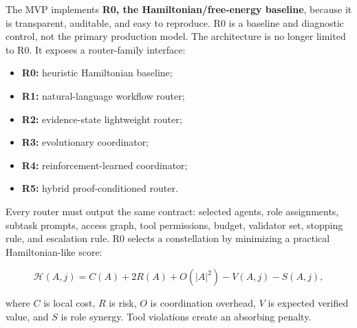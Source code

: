 \documentclass[11pt]{article}
\providecommand{\tightlist}{\setlength{\itemsep}{0pt}\setlength{\parskip}{0pt}}
\begin{document}
The MVP implements \textbf{R0, the Hamiltonian/free-energy baseline}, because it is transparent, auditable, and easy to reproduce. R0 is a baseline and diagnostic control, not the primary production model. The architecture is no longer limited to R0. It exposes a router-family interface:

\begin{itemize}
\tightlist
\item
  \textbf{R0:} heuristic Hamiltonian baseline;
\item
  \textbf{R1:} natural-language workflow router;
\item
  \textbf{R2:} evidence-state lightweight router;
\item
  \textbf{R3:} evolutionary coordinator;
\item
  \textbf{R4:} reinforcement-learned coordinator;
\item
  \textbf{R5:} hybrid proof-conditioned router.
\end{itemize}

Every router must output the same contract: selected agents, role assignments, subtask prompts, access graph, tool permissions, budget, validator set, stopping rule, and escalation rule. R0 selects a constellation by minimizing a practical Hamiltonian-like score:

\[
\mathcal{H}(A,j)
=
C(A)+2R(A)+O(|A|^2)-V(A,j)-S(A,j),
\]

where \(C\) is local cost, \(R\) is risk, \(O\) is coordination overhead, \(V\) is expected verified value, and \(S\) is role synergy. Tool violations create an absorbing penalty.
\end{document}
